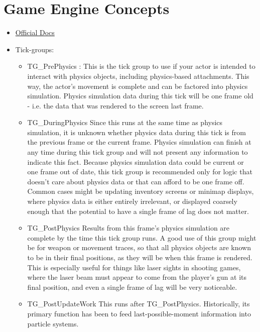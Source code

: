 \documentclass{scrbook}
\begin{document}
        \section{Game Engine Concepts}
            \begin{itemize}
                \item \href{https://docs.unrealengine.com/5.1/en-US/actor-ticking-in-unreal-engine/https://docs.unrealengine.com/5.1/en-US/actor-ticking-in-unreal-engine/}{Official Docs}
                \item Tick-groups:
                \begin{itemize}
                    \item TG\_PrePhysics :
                            This is the tick group to use if your actor is intended to interact with physics objects, including physics-based attachments. This way, the actor's movement is complete and can be factored into physics simulation.
                            Physics simulation data during this tick will be one frame old - i.e. the data that was rendered to the screen last frame. 
                    \item TG\_DuringPhysics
                            Since this runs at the same time as physics simulation, it is unknown whether physics data during this tick is from the previous frame or the current frame. Physics simulation can finish at any time during this tick group and will not present any information to indicate this fact.
                            Because physics simulation data could be current or one frame out of date, this tick group is recommended only for logic that doesn't care about physics data or that can afford to be one frame off. Common cases might be updating inventory screens or minimap displays, where physics data is either entirely irrelevant, or displayed coarsely enough that the potential to have a single frame of lag does not matter.
                    \item TG\_PostPhysics
                            Results from this frame's physics simulation are complete by the time this tick group runs.
                            A good use of this group might be for weapon or movement traces, so that all physics objects are known to be in their final positions, as they will be when this frame is rendered. This is especially useful for things like laser sights in shooting games, where the laser beam must appear to come from the player's gun at its final position, and even a single frame of lag will be very noticeable. 
                    \item TG\_PostUpdateWork
                            This runs after TG\_PostPhysics. Historically, its primary function has been to feed last-possible-moment information into particle systems.
                \end{itemize}
            \end{itemize}
\end{document}
